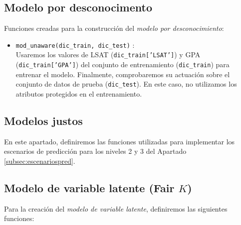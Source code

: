 \documentclass[oneside,openright,titlepage,numbers=noenddot,openany,headinclude,footinclude=true,
cleardoublepage=empty,abstractoff,BCOR=5mm,paper=a4,fontsize=12pt,main=spanish]{scrreprt}
\begin{document}
\subsection*{Modelo por desconocimento}

Funciones creadas para la construcción del \textit{modelo por desconocimiento}:

\begin{itemize}
    \item \texttt{mod\_unaware(dic\_train, dic\_test)} :\\
    Usaremos los valores de LSAT (\texttt{dic\_train['LSAT']}) y GPA (\texttt{dic\_train['GPA']}) del conjunto de entrenamiento (\texttt{dic\_train}) para entrenar el modelo. Finalmente, comprobaremos su actuación sobre el conjunto de datos de prueba (\texttt{dic\_test}). En este caso, no utilizamos los atributos protegidos en el entrenamiento.
\end{itemize}

\subsection{Modelos justos}

En este apartado, definiremos las funciones utilizadas para implementar los escenarios de predicción para los niveles 2 y 3 del Apartado \ref{subsec:escenariospred}.

\subsection*{Modelo de variable latente (Fair $K$)}

Para la creación del \textit{modelo de variable latente}, definiremos las siguientes funciones:
\end{document}
